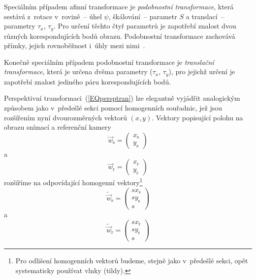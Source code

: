Speciálním případem afinní transformace je \emph{podobnostní transformace},
která sestává z~rotace v~rovině~-- úhel $\psi$, škálování~-- parametr $S$ a
translací~-- parametry $\tau_{x}$, $\tau_{y}$. Pro určení těchto čtyř
parametrů je zapotřebí znalost dvou různých korespondujících bodů
obrazu. Podobnostní transformace zachovává přímky, jejich rovnoběžnost i~úhly
mezi nimi~\cite{AGo:2012:ImageReg:2012}.

Konečně speciálním případem podobnostní transformace je \emph{translační
  transformace}, která je určena dvěma parametry ($\tau_{x}$, $\tau_{y}$), pro
jejichž určení je zapotřebí znalost jediného páru korespondujících bodů.

Perspektivní transformaci~(\ref{EQpersptran}) lze elegantně vyjádřit
analogickým způsobem jako v~předešlé sekci pomocí homogenních souřadnic,
jež jsou rozšířením nyní dvourozměrných vektorů $(x,y)$. Vektory popisující
polohu na obrazu snímací a referenční kamery
\begin{equation}                                                   \label{VEC2s}
  \vec{w}_{\mathrm{s}} =
  \begin{pmatrix}
    x_{\mathrm{s}}\\y_{\mathrm{s}}
  \end{pmatrix}
\end{equation}
a
\begin{equation}                                                   \label{VEC2r}
  \vec{w}_{\mathrm{r}} =
  \begin{pmatrix}
    x_{\mathrm{r}}\\y_{\mathrm{r}}
  \end{pmatrix}
\end{equation}
rozšíříme na odpovídající homogenní vektory\footnote{Pro odlišení homogenních
  vektorů budeme, stejně jako v~předešlé sekci, opět systematicky používat
  vlnky (tildy).}
\begin{equation}                                                   \label{HOM2s}
  \tilde{\vec{w}}_{\mathrm{s}} =
  \begin{pmatrix}
    sx_{\mathrm{s}}\\sy_{\mathrm{s}}\\s
  \end{pmatrix}
\end{equation}
a
\begin{equation}                                                  \label{HOM2r}
  \tilde{\vec{w}}_{\mathrm{r}} =
  \begin{pmatrix}
    sx_{\mathrm{r}}\\sy_{\mathrm{r}}\\s
  \end{pmatrix}
\end{equation}
